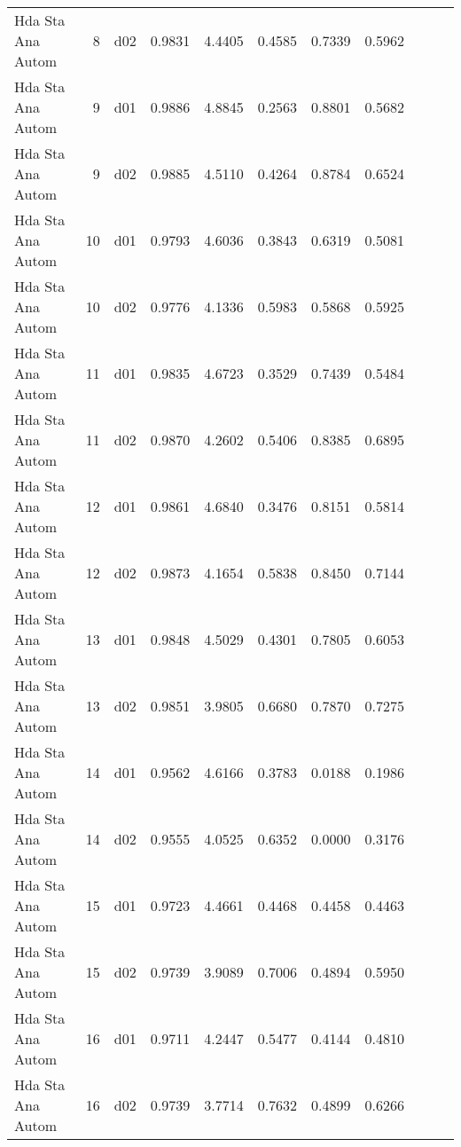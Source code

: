 \begin{landscape}
\begin{longtable}{p{2cm}rrrrrrrrrr}
    Hda Sta Ana Autom  &          8 &     d02 &   0.9831 &  4.4405 &        0.4585 &           0.7339 &  0.5962 \\
    Hda Sta Ana Autom  &          9 &     d01 &   0.9886 &  4.8845 &        0.2563 &           0.8801 &  0.5682 \\
    Hda Sta Ana Autom  &          9 &     d02 &   0.9885 &  4.5110 &        0.4264 &           0.8784 &  0.6524 \\
    Hda Sta Ana Autom  &         10 &     d01 &   0.9793 &  4.6036 &        0.3843 &           0.6319 &  0.5081 \\
    Hda Sta Ana Autom  &         10 &     d02 &   0.9776 &  4.1336 &        0.5983 &           0.5868 &  0.5925 \\
    Hda Sta Ana Autom  &         11 &     d01 &   0.9835 &  4.6723 &        0.3529 &           0.7439 &  0.5484 \\
    Hda Sta Ana Autom  &         11 &     d02 &   0.9870 &  4.2602 &        0.5406 &           0.8385 &  0.6895 \\
    Hda Sta Ana Autom  &         12 &     d01 &   0.9861 &  4.6840 &        0.3476 &           0.8151 &  0.5814 \\
    Hda Sta Ana Autom  &         12 &     d02 &   0.9873 &  4.1654 &        0.5838 &           0.8450 &  0.7144 \\
    Hda Sta Ana Autom  &         13 &     d01 &   0.9848 &  4.5029 &        0.4301 &           0.7805 &  0.6053 \\
    Hda Sta Ana Autom  &         13 &     d02 &   0.9851 &  3.9805 &        0.6680 &           0.7870 &  0.7275 \\
    Hda Sta Ana Autom  &         14 &     d01 &   0.9562 &  4.6166 &        0.3783 &           0.0188 &  0.1986 \\
    Hda Sta Ana Autom  &         14 &     d02 &   0.9555 &  4.0525 &        0.6352 &           0.0000 &  0.3176 \\
    Hda Sta Ana Autom  &         15 &     d01 &   0.9723 &  4.4661 &        0.4468 &           0.4458 &  0.4463 \\
    Hda Sta Ana Autom  &         15 &     d02 &   0.9739 &  3.9089 &        0.7006 &           0.4894 &  0.5950 \\
    Hda Sta Ana Autom  &         16 &     d01 &   0.9711 &  4.2447 &        0.5477 &           0.4144 &  0.4810 \\
    Hda Sta Ana Autom  &         16 &     d02 &   0.9739 &  3.7714 &        0.7632 &           0.4899 &  0.6266 \\

\end{longtable}
\end{landscape}
